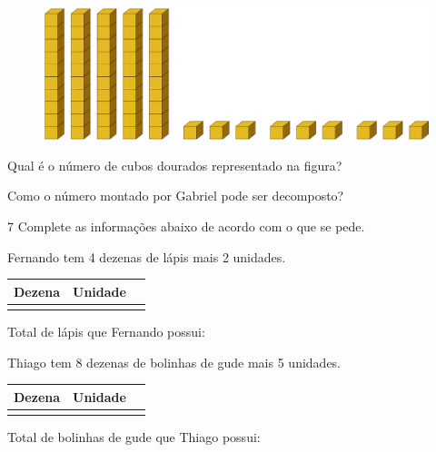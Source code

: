 \begin{figure}[htpb!]
\includegraphics[width=\textwidth]{./media/image3.png}
\end{figure}
\vspace{1.5em}

\begin{escolha}
\item Qual é o número de cubos dourados representado na figura?\\

\item Como o número montado por Gabriel pode ser decomposto?\\
\end{escolha}

\num{7} Complete as informações abaixo de acordo com o que se pede. 

\begin{escolha}
\item
  Fernando tem 4 dezenas de lápis mais 2 unidades.

\begin{longtable}[]{@{}lll@{}}
\toprule
\textbf{Dezena} & \textbf{Unidade}\tabularnewline
\midrule
\endhead
&\tabularnewline
\bottomrule
\end{longtable}


Total de lápis que Fernando possui:\\

\item Thiago tem 8 dezenas de bolinhas de gude mais 5 unidades.

\begin{longtable}[]{@{}lll@{}}
\toprule
\textbf{Dezena} & \textbf{Unidade}\tabularnewline
\midrule
\endhead
&\tabularnewline
\bottomrule
\end{longtable}

Total de bolinhas de gude que Thiago possui:\\
\end{escolha}

